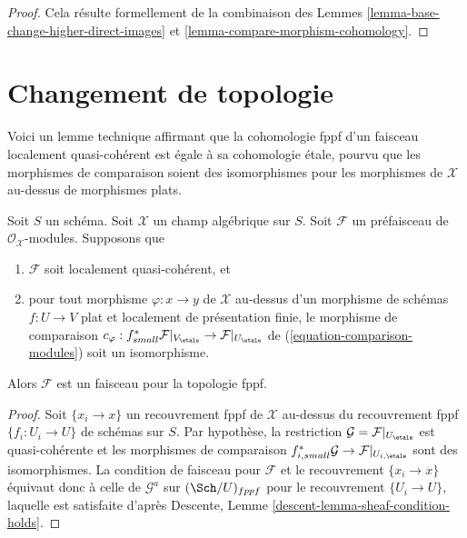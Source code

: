 \begin{proof}
Cela résulte formellement de la combinaison des
Lemmes \ref{lemma-base-change-higher-direct-images} et
\ref{lemma-compare-morphism-cohomology}.
\end{proof}











\section{Changement de topologie}
\label{section-change-topology}

\noindent
Voici un lemme technique affirmant que la cohomologie fppf
d'un faisceau localement quasi-cohérent est égale à sa cohomologie
\'etale, pourvu que les morphismes de comparaison soient des isomorphismes
pour les morphismes de $\mathcal{X}$ au-dessus de morphismes plats.

\begin{lemma}
\label{lemma-lqc-flat-base-change-fppf-sheaf}
Soit $S$ un schéma. Soit $\mathcal{X}$ un champ algébrique sur $S$.
Soit $\mathcal{F}$ un préfaisceau de $\mathcal{O}_\mathcal{X}$-modules.
Supposons que
\begin{enumerate}
\item[(a)] $\mathcal{F}$ soit localement quasi-cohérent, et
\item[(b)] pour tout morphisme $\varphi : x \to y$ de $\mathcal{X}$ au-dessus
d'un morphisme de schémas $f : U \to V$ plat et
localement de présentation finie, le morphisme de comparaison
$c_\varphi : f_{small}^*\mathcal{F}|_{V_\etale} \to
\mathcal{F}|_{U_\etale}$ de
(\ref{equation-comparison-modules}) soit un isomorphisme.
\end{enumerate}
Alors $\mathcal{F}$ est un faisceau pour la topologie fppf.
\end{lemma}

\begin{proof}
Soit $\{x_i \to x\}$ un recouvrement fppf de $\mathcal{X}$ au-dessus du
recouvrement fppf $\{f_i : U_i \to U\}$ de schémas sur $S$.
Par hypothèse, la restriction $\mathcal{G} = \mathcal{F}|_{U_\etale}$
est quasi-cohérente et les morphismes de comparaison
$f_{i, small}^*\mathcal{G} \to \mathcal{F}|_{U_{i, \etale}}$
sont des isomorphismes. La condition de faisceau pour $\mathcal{F}$
et le recouvrement $\{x_i \to x\}$ équivaut donc à celle de
$\mathcal{G}^a$ sur $(\Sch/U)_{fppf}$ pour le recouvrement $\{U_i \to U\}$,
laquelle est satisfaite d'après
Descente, Lemme \ref{descent-lemma-sheaf-condition-holds}.
\end{proof}

